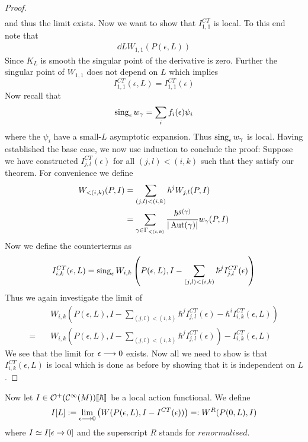 \begin{theo}
\begin{proof}
\begin{align}
  \end{align}
  and thus the limit exists. Now we want to show that $I_{1,1}^{CT}$ is local. To this end note that
  \begin{align}
    \dd{}{L} W_{1,1}(P(\epsilon,L))
  \end{align}
  Since $K_L$ is smooth the singular point of the derivative is zero. Further the singular point of $W_{1,1}$ does not depend on $L$ which implies
  \begin{equation}
    I_{1,1}^{CT}(\epsilon, L) = I_{1,1}^{CT}(\epsilon)
  \end{equation}
  Now recall that
  \begin{equation}
    \sing_\epsilon w_\gamma = \sum_i f_i(\epsilon) \psi_i
  \end{equation}
  where the $\psi_i$ have a small-$L$ asymptotic expansion. Thus $\sing_\epsilon w_\gamma$ is local. Having established the base case, we now use induction to conclude the proof: Suppose we have constructed $I_{j,l}^{CT}(\epsilon)$ for all $(j,l)<(i,k)$ such that they satisfy our theorem. For convenience we define
  \begin{align}
    W_{<(i,k)} (P,I) &= \sum_{(j,l)<(i,k)} \hbar^j W_{j,l}(P,I)\\
    &= \sum_{\gamma \in \Gamma_{<(i,k)}} \frac{\hbar^{g(\gamma)}}{|\operatorname{Aut}(\gamma)|} w_\gamma (P,I)
  \end{align}
  Now we define the counterterms as
  \begin{equation}I_{i,k}^{CT}(\epsilon, L) = \sing_\epsilon W_{i,k}\left(P(\epsilon,L), I - \sum_{(j,l)<(i,k)}\hbar^j I_{j,l}^{CT}(\epsilon)\right)\end{equation}
  Thus we again investigate the limit of
  \begin{align}
    &W_{i,k}\left( P(\epsilon,L), I - \sum_{(j,l)<(i,k)}\hbar^j I_{j,l}^{CT}(\epsilon) - \hbar^i I_{i,k}^{CT}(\epsilon, L) \right)\\
    = \quad &W_{i,k}\left( P(\epsilon,L), I - \sum_{(j,l)<(i,k)}\hbar^j I_{j,l}^{CT}(\epsilon) \right) - I_{i,k}^{CT}(\epsilon, L)
  \end{align}
  We see that the limit for $\epsilon \lra 0$ exists. Now all we need to show is that $I_{i,k}^{CT}(\epsilon,L)$ is local which is done as before by showing that it is independent on $L$.
\end{proof}
\end{theo}

Now let $I \in \mathcal{O}^+(\mathcal{C}^{\infty}(M))\llbracket \hbar \rrbracket$ be a local action functional. We define
\begin{equation} I[L] := \lim_{\epsilon \lra 0} \left( W(P(\epsilon,L), I - I^{CT}(\epsilon)) \right) =: W^R(P(0,L), I)\end{equation}
where $I \simeq I[\epsilon \ra 0] $ and the superscript $R$ stands for $renormalised$.

